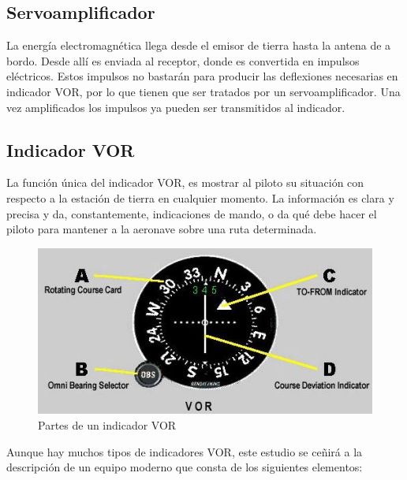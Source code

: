\subsection{Servoamplificador}
La energía electromagnética llega desde el emisor de tierra hasta la antena de a bordo. Desde allí es enviada al receptor, donde es convertida en impulsos eléctricos. Estos impulsos no bastarán para producir las deflexiones necesarias en indicador VOR, por lo que tienen que ser tratados por un servoamplificador. Una vez amplificados los impulsos ya pueden ser transmitidos al indicador.

\subsection{Indicador VOR}

La función única del indicador VOR, es mostrar al piloto su situación con respecto a la estación de tierra en cualquier momento. La información es clara y precisa y da, constantemente, indicaciones de mando, o da qué debe hacer el piloto para mantener a la aeronave sobre una ruta determinada. 

\begin{figure}[!htb]
  \centering
  \includegraphics[width=\textwidth]{06.radionavegacion/Imagenes/06.02.vor.imagenes/vor_indicator.eps}
  \caption{Partes de un indicador VOR}
  \label{fig:indicador-vor}
\end{figure}

Aunque hay muchos tipos de indicadores VOR, este estudio se ce\~nir\'a a la descripci\'on de un equipo moderno que consta de los siguientes elementos:

